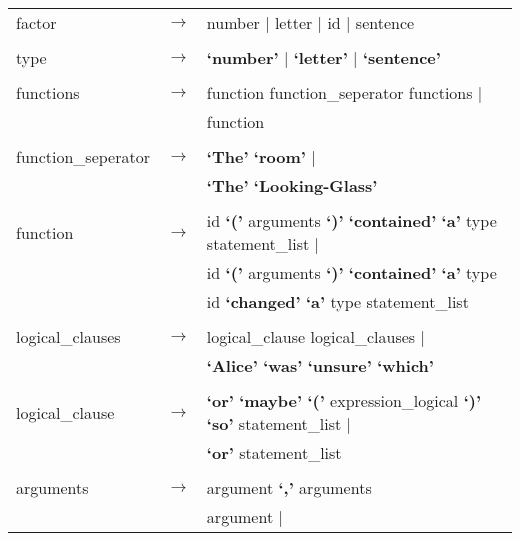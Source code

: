 \documentclass[landscape]{article}
\begin{document}
\begin{longtable}{ l c l}
    \\

    factor & \ensuremath{\to} &  number  | letter  | id  | sentence   \\

    \\

    type & \ensuremath{\to} &  \textbf{`number'}  | \textbf{`letter'}  | \textbf{`sentence'}   \\

    \\

    functions & \ensuremath{\to} &  function  function\_seperator  functions   | \\
    & &  function \\

    \\

    function\_seperator & \ensuremath{\to} &  \textbf{`The'} \textbf{`room'}  | \\
    & & \textbf{`The'} \textbf{`Looking-Glass'} \\

    \\

    function & \ensuremath{\to} &  id \textbf{`('} arguments  \textbf{`)'} \textbf{`contained'} \textbf{`a'} type  statement\_list   | \\
    & &  id \textbf{`('} arguments  \textbf{`)'} \textbf{`contained'} \textbf{`a'} type \\
	& &  id \textbf{`changed'} \textbf{`a'} type  statement\_list  \\

    \\

    logical\_clauses & \ensuremath{\to} &  logical\_clause  logical\_clauses   | \\
    & &  \textbf{`Alice'} \textbf{`was'} \textbf{`unsure'} \textbf{`which'}  \\

    \\

    logical\_clause & \ensuremath{\to} &  \textbf{`or'} \textbf{`maybe'} \textbf{`('} expression\_logical  \textbf{`)'} \textbf{`so'} statement\_list   | \\
    & &  \textbf{`or'} statement\_list   \\

    \\

    arguments & \ensuremath{\to} &  argument  \textbf{`,'} arguments    \\
    & &  argument   | \\


\end{longtable}
\end{document}
